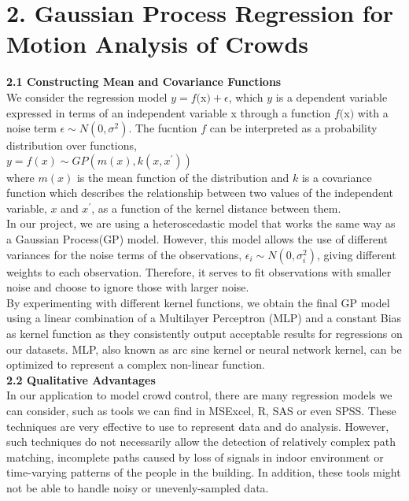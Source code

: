 \documentclass[letterpaper]{article}
\begin{document}
\section{2.  Gaussian Process Regression for Motion Analysis of Crowds}

{\bf2.1  Constructing Mean and Covariance Functions} \\

We consider the regression model $y = f($x$) + \epsilon$, which $y$ is a dependent variable expressed in terms of an independent variable x through a function $f($x$)$ with a noise term $\epsilon \sim N(0, \sigma^2)$. The fucntion $f$ can be interpreted as a probability distribution over functions, \\

$ y = f(x) \sim GP(m(x), k(x,x^\prime))$ \\

where $m(x)$ is the mean function of the distribution and $k$ is a covariance function which describes the relationship between two values of the independent variable, $x$ and $x^\prime$, as a function of the kernel distance between them. \\

In our project, we are using a heteroscedastic model that works the same way as a Gaussian Process(GP) model. However, this model allows the use of different variances for the noise terms of the observations, $\epsilon_i \sim N(0, \sigma_i^2)$, giving different weights to each observation. Therefore, it serves to fit observations with smaller noise and choose to ignore those with larger noise. \\

By experimenting with different kernel functions, we obtain the final GP model using a linear combination of a Multilayer Perceptron (MLP) and a constant Bias as kernel function as they consistently output acceptable results for regressions on our datasets. MLP, also known as arc sine kernel or neural network kernel, can be optimized to represent a complex non-linear function. \\

{\bf2.2  Qualitative Advantages} \\

In our application to model crowd control, there are many regression models we can consider, such as tools we can find in MSExcel, R, SAS or even SPSS. These techniques are very effective to use to represent data and do analysis. However, such techniques do not necessarily allow the detection of relatively complex path matching, incomplete paths caused by loss of signals in indoor environment or time-varying patterns of the people in the building. In addition, these tools might not be able to handle noisy or unevenly-sampled data. \\
\end{document}
